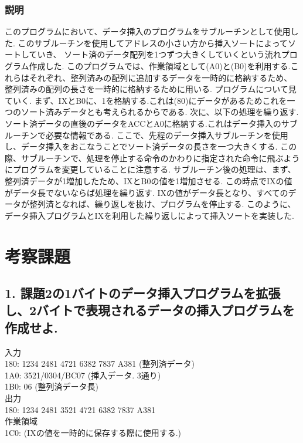\documentclass[titlepage]{jsarticle}
\theoremstyle{definition}
\begin{document}
\subsubsection{説明}
このプログラムにおいて、データ挿入のプログラムをサブルーチンとして使用した.
このサブルーチンを使用してアドレスの小さい方から挿入ソートによってソートしていき、
ソート済のデータ配列を1つずつ大きくしていくという流れプログラム作成した.
このプログラムでは、作業領域として(A0)と(B0)を利用する.これらはそれぞれ、整列済みの配列に追加するデータを一時的に格納するため、
整列済みの配列の長さを一時的に格納するために用いる.
プログラムについて見ていく.
まず、IXとB0に、1を格納する.これは(80)にデータがあるためこれを一つのソート済みデータとも考えられるからである.
次に、以下の処理を繰り返す.
ソート済データの直後のデータをACCとA0に格納する.これはデータ挿入のサブルーチンで必要な情報である.
ここで、先程のデータ挿入サブルーチンを使用し、データ挿入をおこなうことでソート済データの長さを一つ大きくする.
この際、サブルーチンで、処理を停止する命令のかわりに指定された命令に飛ぶようにプログラムを変更していることに注意する.
サブルーチン後の処理は、まず、整列済データが1増加したため、IXとB0の値を1増加させる.
この時点でIXの値がデータ長でないならば処理を繰り返す.
IXの値がデータ長となり、すべてのデータが整列済となれば、繰り返しを抜け、プログラムを停止する.
このように、データ挿入プログラムとIXを利用した繰り返しによって挿入ソートを実装した.

\section{考察課題}

\subsection*{1. 課題2の1バイトのデータ挿入プログラムを拡張し、2バイトで表現されるデータの挿入プログラムを作成せよ.}

入力 \\
180: 1234 2481 4721 6382 7837 A381 (整列済データ) \\
1A0: 3521/0304/BC07 (挿入データ. 3通り) \\
1B0: 06 (整列済データ長) \\

出力 \\
180: 1234 2481 3521 4721 6382 7837 A381 \\

作業領域 \\
1C0: (IXの値を一時的に保存する際に使用する.) \\
\end{document}
